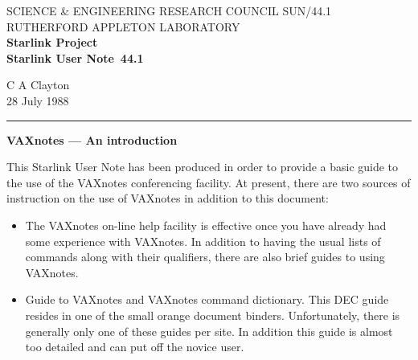 \pagestyle{myheadings}

\newcommand{\stardoccategory}  {Starlink User Note}
\newcommand{\stardocinitials}  {SUN}
\newcommand{\stardocnumber}    {44.1}
\newcommand{\stardocauthors}   {C A Clayton}
\newcommand{\stardocdate}      {28 July 1988}
\newcommand{\stardoctitle}     {VAXnotes --- An introduction}

\newcommand{\stardocname}{\stardocinitials /\stardocnumber}
\markright{\stardocname}
\setlength{\textwidth}{160mm}
\setlength{\textheight}{240mm}
\setlength{\topmargin}{-5mm}
\setlength{\oddsidemargin}{0mm}
\setlength{\evensidemargin}{0mm}
\setlength{\parindent}{0mm}
\setlength{\parskip}{\medskipamount}
\setlength{\unitlength}{1mm}


\thispagestyle{empty}
SCIENCE \& ENGINEERING RESEARCH COUNCIL \hfill \stardocname\\
RUTHERFORD APPLETON LABORATORY\\
{\large\bf Starlink Project\\}
{\large\bf \stardoccategory\ \stardocnumber}
\begin{flushright}
\stardocauthors\\
\stardocdate
\end{flushright}
\vspace{-4mm}
\rule{\textwidth}{0.5mm}
\vspace{5mm}
\begin{center}
{\Large\bf \stardoctitle}
\end{center}
\vspace{5mm}

This Starlink User Note has been produced in order to provide a basic 
guide to the use of the VAXnotes conferencing facility.
At present, there are two sources of instruction on the use of VAXnotes
in addition to this document:

\begin{itemize}

\item The VAXnotes on-line help facility is effective once you
have already had some experience with VAXnotes. In addition to having
the usual lists of commands along with their qualifiers, there are
also brief guides to using VAXnotes.

\item Guide to VAXnotes and VAXnotes command dictionary. This DEC
guide resides in one of the small orange document binders. Unfortunately,
there is generally only one of these guides per site. In
addition this guide is almost too detailed and can put off the novice user.


\end{itemize}

